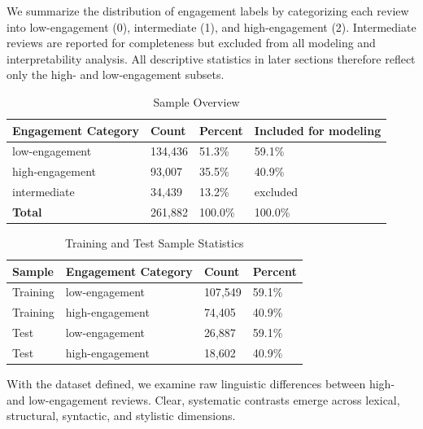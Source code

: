 \documentclass[12pt]{article}
\begin{document}
We summarize the distribution of engagement labels by categorizing each review into low-engagement (0), intermediate (1), and high-engagement (2). Intermediate reviews are reported for completeness but excluded from all modeling and interpretability analysis. All descriptive statistics in later sections therefore reflect only the high- and low-engagement subsets.

\begin{longtable}{llll}
\caption{Sample Overview} \\    
\textbf{Engagement Category} & \textbf{Count} & \textbf{Percent} & \textbf{Included for modeling} \\
\hline
low-engagement & 134{,}436 & 51.3\% & 59.1\% \\
high-engagement & 93{,}007 & 35.5\% & 40.9\% \\
intermediate & 34{,}439 & 13.2\% & excluded \\
\textbf{Total} & 261{,}882 & 100.0\% & 100.0\% \\
\end{longtable}

\begin{longtable}{llll}
\caption{Training and Test Sample Statistics} \\    
\textbf{Sample} & \textbf{Engagement Category} & \textbf{Count} & \textbf{Percent} \\
\hline
Training & low-engagement & 107{,}549 & 59.1\% \\
Training & high-engagement & 74{,}405 & 40.9\% \\
Test & low-engagement & 26{,}887 & 59.1\% \\
Test & high-engagement & 18{,}602 & 40.9\% \\
\end{longtable}

With the dataset defined, we examine raw linguistic differences between high- and low-engagement reviews. Clear, systematic contrasts emerge across lexical, structural, syntactic, and stylistic dimensions.
\end{document}
